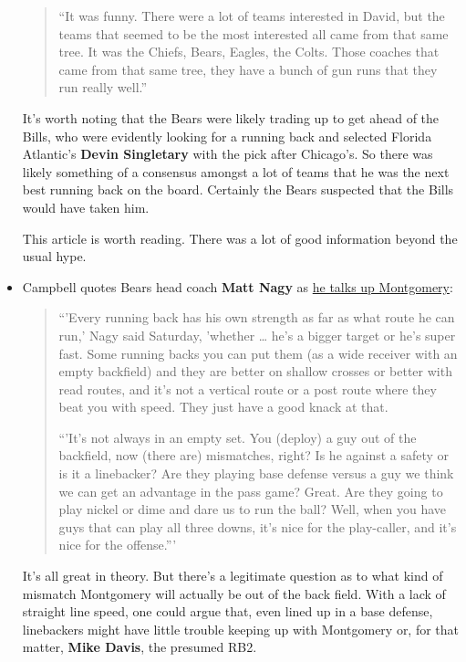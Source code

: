 \documentclass[11pt]{article}
\begin{document}
\begin{itemize}
\begin{quote}
``It was funny. There were a lot of teams interested in David, but the teams that seemed to be the most interested all came from that same tree. It was the Chiefs, Bears, Eagles, the Colts. Those coaches that came from that same tree, they have a bunch of gun runs that they run really well.''
\end{quote}

It's worth noting that the Bears were likely trading up to get ahead of the Bills, who were evidently looking for a running back and selected Florida Atlantic's \textbf{Devin Singletary} with the pick after Chicago's.  So there was likely something of a consensus amongst a lot of teams that he was the next best running back on the board.  Certainly the Bears suspected that the Bills would have taken him.

This article is worth reading.  There was a lot of good information beyond the usual hype.

\item Campbell quotes Bears head coach \textbf{Matt Nagy} as \href{https://www.chicagotribune.com/sports/football/bears/ct-spt-bears-draft-observations-david-montgomery-20190429-story.html}{he talks up Montgomery}:

\begin{quote}
  ``'Every running back has his own strength as far as what route he can run,' Nagy said Saturday, 'whether … he’s a bigger target or he’s super fast. Some running backs you can put them (as a wide receiver with an empty backfield) and they are better on shallow crosses or better with read routes, and it’s not a vertical route or a post route where they beat you with speed. They just have a good knack at that.

``'It’s not always in an empty set. You (deploy) a guy out of the backfield, now (there are) mismatches, right? Is he against a safety or is it a linebacker? Are they playing base defense versus a guy we think we can get an advantage in the pass game? Great. Are they going to play nickel or dime and dare us to run the ball? Well, when you have guys that can play all three downs, it’s nice for the play-caller, and it’s nice for the offense.'''
\end{quote}

It's all great in theory.  But there's a legitimate question as to what kind of mismatch Montgomery will actually be out of the back field.  With a lack of straight line speed, one could argue that, even lined up in a base defense, linebackers might have little trouble keeping up with Montgomery or, for that matter, \textbf{Mike Davis}, the presumed RB2.


\end{itemize}
\end{document}
